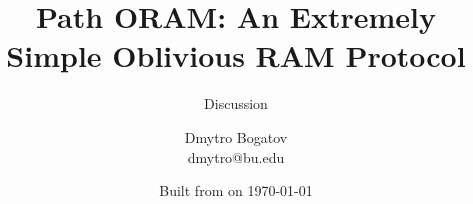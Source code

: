 
\title{Path ORAM: An Extremely Simple Oblivious RAM Protocol} %

\subtitle{Discussion}

\date{Built from \emph{} on \today}

\author{Dmytro Bogatov \\ dmytro@bu.edu}


